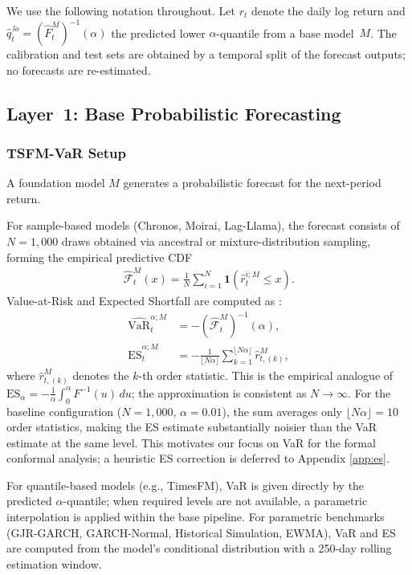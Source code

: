 \documentclass[preprint,11pt,authoryear]{elsarticle}
\newcommand{\VaR}{\mathrm{VaR}}
\newcommand{\ES}{\mathrm{ES}}
\newcommand{\1}{\boldsymbol{1}}
\newcommand{\Fhat}{\hat{\mathcal{F}}}
\begin{document}
	We use the following notation throughout. Let $r_t$
	denote the daily log return and
	$\hat{q}_t^{\,lo} = (\hat{F}_t^M)^{-1}(\alpha)$ the
	predicted lower $\alpha$-quantile from a base model~$M$.
	The calibration and test sets are obtained by a temporal
	split of the forecast outputs; no forecasts are
	re-estimated.
	
	\subsection{Layer~1: Base Probabilistic Forecasting}
	\label{sec:layer1}
	
	\subsubsection{TSFM-VaR Setup}
	\label{sec:setup}
	
	A foundation model $M$ generates a probabilistic forecast for
	the next-period return.
	
	For sample-based models (Chronos,
	Moirai, Lag-Llama), the forecast consists of $N=1{,}000$ draws
	obtained via ancestral or mixture-distribution sampling,
	forming the empirical predictive CDF
	\begin{align}
		\Fhat_t^M(x) = \frac{1}{N}\sum_{i=1}^{N}
		\1(\hat{r}_t^{i;M}\leq x).
	\end{align}
	Value-at-Risk and Expected Shortfall are computed as
	\citep{pele2025llmvar}:
	\begin{align}
		\widehat{\VaR}_t^{\alpha;M}
		&= -(\Fhat_t^M)^{-1}(\alpha), \\
		\widehat{\ES}_t^{\alpha;M}
		&= -\frac{1}{\lfloor N\alpha\rfloor}
		\sum_{k=1}^{\lfloor N\alpha\rfloor}\hat{r}_{t,(k)}^M,
	\end{align}
	where $\hat{r}_{t,(k)}^M$ denotes the $k$-th order statistic.
	This is the empirical analogue of
	$\ES_\alpha = -\frac{1}{\alpha}\int_0^\alpha F^{-1}(u)\,du$;
	the approximation is consistent as $N \to \infty$.
	For the baseline configuration ($N = 1{,}000$,
	$\alpha = 0.01$), the sum averages only
	$\lfloor N\alpha \rfloor = 10$ order statistics, making
	the ES estimate substantially noisier than the VaR
	estimate at the same level. This motivates our focus
	on VaR for the formal conformal analysis; a heuristic
	ES correction is deferred to Appendix \ref{app:es}.
	
	For quantile-based models (e.g., TimesFM), VaR is given
	directly by the predicted $\alpha$-quantile; when required
	levels are not available, a parametric interpolation is applied
	within the base pipeline. For parametric benchmarks
	(GJR-GARCH, GARCH-Normal, Historical Simulation, EWMA), VaR
	and ES are computed from the model's conditional distribution
	with a 250-day rolling estimation window.
	
\end{document}

